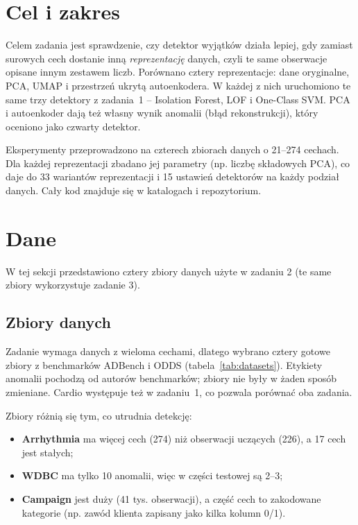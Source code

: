 \documentclass[11pt,a4paper]{article}
\begin{document}
\tableofcontents
\newpage

\section{Cel i zakres}

Celem zadania jest sprawdzenie, czy detektor wyjątków działa lepiej, gdy
zamiast surowych cech dostanie inną \emph{reprezentację} danych, czyli te
same obserwacje opisane innym zestawem liczb. Porównano cztery
reprezentacje: dane oryginalne, PCA, UMAP i przestrzeń ukrytą autoenkodera.
W każdej z nich uruchomiono te same trzy detektory z zadania~1 -- Isolation
Forest, LOF i One-Class SVM. PCA i autoenkoder dają też własny wynik
anomalii (błąd rekonstrukcji), który oceniono jako czwarty detektor.

Eksperymenty przeprowadzono na czterech zbiorach danych o 21--274 cechach.
Dla każdej reprezentacji zbadano jej parametry (np. liczbę składowych PCA),
co daje do 33 wariantów reprezentacji i 15 ustawień detektorów na każdy
podział danych. Cały kod znajduje się w katalogach 
i  repozytorium.

\FloatBarrier
\section{Dane}

W tej sekcji przedstawiono cztery zbiory danych użyte w zadaniu 2 (te same
zbiory wykorzystuje zadanie 3).

\FloatBarrier
\subsection{Zbiory danych}

Zadanie wymaga danych z wieloma cechami, dlatego wybrano cztery gotowe zbiory
z benchmarków ADBench i ODDS (tabela~\ref{tab:datasets}). Etykiety anomalii
pochodzą od autorów benchmarków; zbiory nie były w żaden sposób zmieniane.
Cardio występuje też w zadaniu~1, co pozwala porównać oba zadania.

\begin{table}[H]
  \centering\small
  \caption{Zbiory danych użyte w zadaniu.}
  \label{tab:datasets}
\end{table}

Zbiory różnią się tym, co utrudnia detekcję:
\begin{itemize}
  \item \textbf{Arrhythmia} ma więcej cech (274) niż obserwacji uczących
  (226), a 17 cech jest stałych;
  \item \textbf{WDBC} ma tylko 10 anomalii, więc w części testowej są 2--3;
  \item \textbf{Campaign} jest duży (41 tys. obserwacji), a część cech to
  zakodowane kategorie (np. zawód klienta zapisany jako kilka kolumn 0/1).
\end{itemize}
\end{document}
